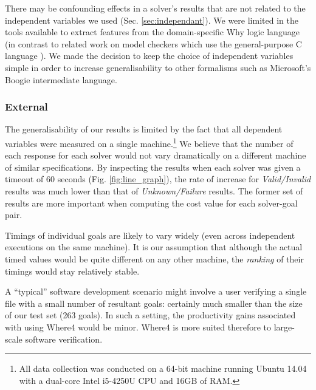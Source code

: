 \documentclass[runningheads,a4paper]{llncs}
\begin{document}
There may be confounding effects in a solver's results that are not related to the independent variables we used (Sec. \ref{sec:independant}). We were limited in the tools available to extract features from the domain-specific Why logic language (in contrast to related work on model checkers which use the general-purpose C language \cite{DPVZ15:CAV}\cite{MUX}). We made the decision to keep the choice of independent variables simple in order to increase generalisability to other formalisms such as Microsoft's Boogie \cite{Boogie} intermediate language.  

\subsubsection{External}

The generalisability of our results is limited by the fact that all dependent variables were measured on a single machine.\footnote{All data collection was conducted on a 64-bit machine running Ubuntu 14.04 with a dual-core Intel i5-4250U CPU and 16GB of RAM.} We believe that the number of each response for each solver would not vary dramatically on a different machine of similar specifications. By inspecting the results when each solver was given a timeout of 60 seconds (Fig. \ref{fig:line_graph}), the rate of increase for \textit{Valid/Invalid} results was much lower than that of \textit{Unknown/Failure} results. The former set of results are more important when computing the cost value for each solver-goal pair.

Timings of individual goals are likely to vary widely (even across independent executions on the same machine).
It is our assumption that although the actual timed values would be quite different on any other machine, the \textit{ranking} of their timings would stay relatively stable.

A ``typical'' software development scenario might involve a user verifying a single file with a small number of resultant goals: certainly much smaller than the size of our test set (263 goals). In such a setting, the productivity gains associated with using \textsf{Where4} would be minor. \textsf{Where4} is more suited therefore to large-scale software verification.
\end{document}
